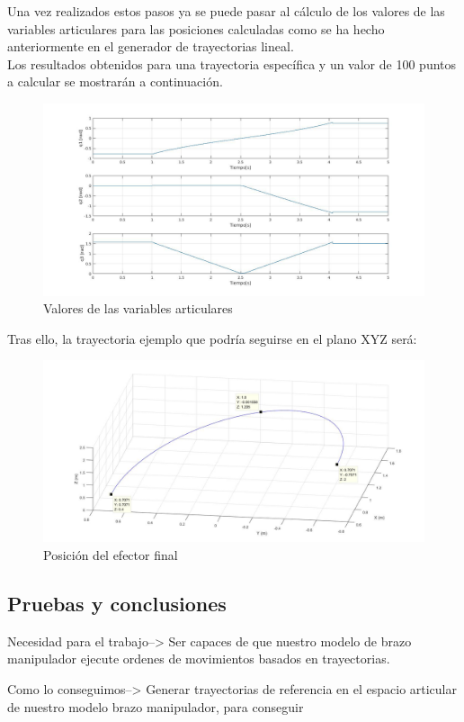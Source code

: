 	Una vez realizados estos pasos ya se puede pasar al cálculo de los valores de las variables articulares para las posiciones calculadas como se ha hecho anteriormente en el generador de trayectorias lineal.\\

	Los resultados obtenidos para una trayectoria específica y un valor de 100 puntos a calcular se mostrarán a continuación.
	\begin{figure}[h!]
	\centering
	\includegraphics[width=.7\textwidth]{GDT_C_articulares}
	\caption{Valores de las variables articulares}
	\end{figure}

\newpage
Tras ello, la trayectoria ejemplo que podría seguirse en el plano XYZ será:
	\begin{figure}[h!]
	\centering
	\includegraphics[width=.8\textwidth]{GDT_C_efector}
	\caption{Posición del efector final}
	\end{figure}

	\subsection{Pruebas y conclusiones}
		Necesidad para el trabajo-->
		 Ser capaces de que nuestro modelo de brazo manipulador ejecute ordenes de movimientos basados en trayectorias.

	    Como lo conseguimos-->
	   		Generar trayectorias de referencia en el espacio articular de nuestro modelo brazo manipulador, para conseguir
